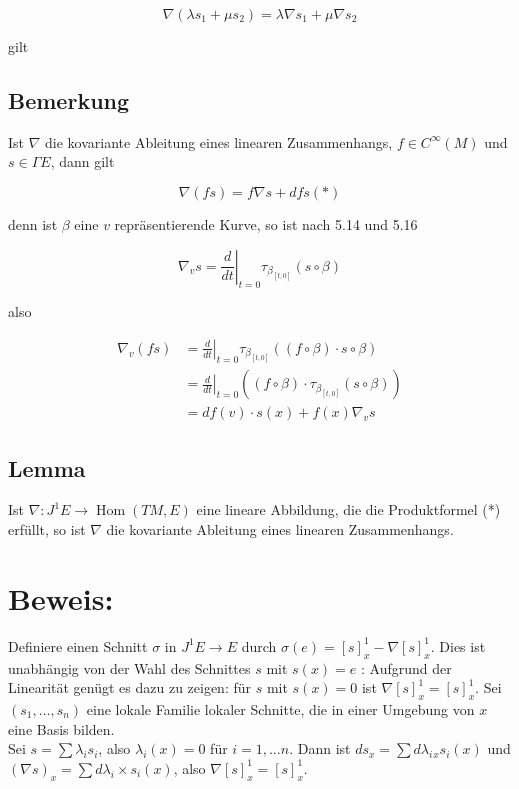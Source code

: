 \documentclass[10pt, letterpaper]{article}
\begin{document}
$$
\nabla\left(\lambda s_{1}+\mu s_{2}\right)=\lambda \nabla s_{1}+\mu \nabla s_{2}
$$

gilt

\subsection*{Bemerkung}
Ist $\nabla$ die kovariante Ableitung eines linearen Zusammenhangs, $f \in C^{\infty}(M)$ und $s \in \Gamma E$, dann gilt

$$
\nabla(f s)=f \nabla s+d f s(*)
$$

denn ist $\beta$ eine $v$ repräsentierende Kurve, so ist nach 5.14 und 5.16

$$
\nabla_{v} s=\left.\frac{d}{d t}\right|_{t=0} \tau_{\beta_{[t, 0]}}(s \circ \beta)
$$

also

$$
\begin{aligned}
\nabla_{v}(f s) & =\left.\frac{d}{d t}\right|_{t=0} \tau_{\beta_{[t, 0]}}((f \circ \beta) \cdot s \circ \beta) \\
& =\left.\frac{d}{d t}\right|_{t=0}\left((f \circ \beta) \cdot \tau_{\beta_{[t, 0]}}(s \circ \beta)\right) \\
& =d f(v) \cdot s(x)+f(x) \nabla_{v} s
\end{aligned}
$$

\subsection*{Lemma}
Ist $\nabla: J^{1} E \rightarrow \operatorname{Hom}(T M, E)$ eine lineare Abbildung, die die Produktformel (*) erfüllt, so ist $\nabla$ die kovariante Ableitung eines linearen Zusammenhangs.

\section*{Beweis:}
Definiere einen Schnitt $\sigma$ in $J^{1} E \rightarrow E$ durch $\sigma(e)=[s]_{x}^{1}-\nabla[s]_{x}^{1}$. Dies ist unabhängig von der Wahl des Schnittes $s$ mit $s(x)=e$ : Aufgrund der Linearität genügt es dazu zu zeigen: für $s$ mit $s(x)=0$ ist $\nabla[s]_{x}^{1}=[s]_{x}^{1}$. Sei $\left(s_{1}, \ldots, s_{n}\right)$ eine lokale Familie lokaler Schnitte, die in einer Umgebung von $x$ eine Basis bilden.\\
Sei $s=\sum \lambda_{i} s_{i}$, also $\lambda_{i}(x)=0$ für $i=1, \ldots n$. Dann ist $d s_{x}=\sum d \lambda_{i}{ }_{x} s_{i}(x)$ und $(\nabla s)_{x}=\sum d \lambda_{i} \times s_{i}(x)$, also $\nabla[s]_{x}^{1}=[s]_{x}^{1}$.
\end{document}
